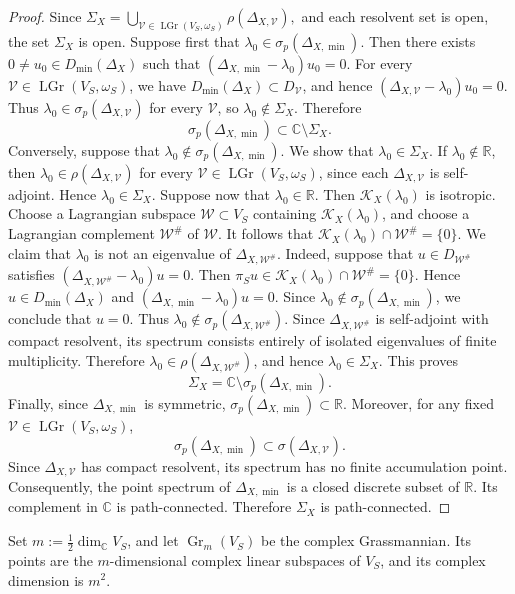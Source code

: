 \documentclass[12pt]{amsart}
\theoremstyle{plain}
\theoremstyle{definition}
\theoremstyle{remark}
\numberwithin{equation}{section} \numberwithin{figure}{section}
\newcommand{\mb}[1]{\mathbb{#1}} %
\newcommand{\mc}[1]{\mathcal{#1}}
\begin{document}
\begin{proof}
Since
\(
    \Sigma_X
    =
    \bigcup_{\mc V\in\operatorname{LGr}(V_S,\omega_S)}
    \rho(\Delta_{X,\mc V}),
\)
and each resolvent set is open, the set \(\Sigma_X\) is open.
Suppose first that
\(\lambda_0\in\sigma_p(\Delta_{X,\min})\). Then there exists
\(0\neq u_0\in D_{\min}(\Delta_X)\) such that
\(
    (\Delta_{X,\min}-\lambda_0)u_0=0.
\)
For every
\(\mc V\in\operatorname{LGr}(V_S,\omega_S)\), we have
\(D_{\min}(\Delta_X)\subset D_{\mc V}\), and hence
\(
    (\Delta_{X,\mc V}-\lambda_0)u_0=0.
\)
Thus
\(\lambda_0\in\sigma_p(\Delta_{X,\mc V})\) for every \(\mc V\), so
\(\lambda_0\notin\Sigma_X\). Therefore
\[
    \sigma_p(\Delta_{X,\min})
    \subset
    \mb C\setminus\Sigma_X.
\]
Conversely, suppose that
\(\lambda_0\notin\sigma_p(\Delta_{X,\min})\). We show that
\(\lambda_0\in\Sigma_X\).
If \(\lambda_0\notin\mb R\), then
\(\lambda_0\in\rho(\Delta_{X,\mc V})\) for every
\(\mc V\in\operatorname{LGr}(V_S,\omega_S)\), since each
\(\Delta_{X,\mc V}\) is self-adjoint. Hence
\(\lambda_0\in\Sigma_X\).
Suppose now that \(\lambda_0\in\mb R\). Then
\(\mc K_X(\lambda_0)\) is isotropic. Choose a Lagrangian subspace
\(\mc W\subset V_S\) containing \(\mc K_X(\lambda_0)\), and choose a
Lagrangian complement \(\mc W^\#\) of \(\mc W\). It follows that
\(
    \mc K_X(\lambda_0)\cap\mc W^\#=\{0\}.
\)
We claim that \(\lambda_0\) is not an eigenvalue of
\(\Delta_{X,\mc W^\#}\). Indeed, suppose that
\(u\in D_{\mc W^\#}\) satisfies
\(
    (\Delta_{X,\mc W^\#}-\lambda_0)u=0.
\)
Then
\(
    \pi_Su
    \in
    \mc K_X(\lambda_0)\cap\mc W^\#
    =
    \{0\}.
\)
Hence \(u\in D_{\min}(\Delta_X)\) and
\(
    (\Delta_{X,\min}-\lambda_0)u=0.
\)
Since
\(\lambda_0\notin\sigma_p(\Delta_{X,\min})\), we conclude that
\(u=0\). Thus
\(\lambda_0\notin\sigma_p(\Delta_{X,\mc W^\#})\).
Since \(\Delta_{X,\mc W^\#}\) is self-adjoint with compact resolvent,
its spectrum consists entirely of isolated eigenvalues of finite
multiplicity. Therefore
\(\lambda_0\in\rho(\Delta_{X,\mc W^\#})\), and hence
\(\lambda_0\in\Sigma_X\). This proves
\[
    \Sigma_X
    =
    \mb C\setminus\sigma_p(\Delta_{X,\min}).
\]
Finally, since \(\Delta_{X,\min}\) is symmetric,
\(\sigma_p(\Delta_{X,\min})\subset\mb R\). Moreover, for any fixed
\(\mc V\in\operatorname{LGr}(V_S,\omega_S)\),
\[
    \sigma_p(\Delta_{X,\min})
    \subset
    \sigma(\Delta_{X,\mc V}).
\]
Since \(\Delta_{X,\mc V}\) has compact resolvent, its spectrum has no
finite accumulation point. Consequently, the point spectrum of
\(\Delta_{X,\min}\) is a closed discrete subset of \(\mb R\). Its
complement in \(\mb C\) is path-connected.
Therefore \(\Sigma_X\) is path-connected.
\end{proof}
Set \(m:=\frac12\dim_{\mb C}V_S\), and let
\(\operatorname{Gr}_m(V_S)\) be the complex Grassmannian. Its points
are the \(m\)-dimensional complex linear subspaces of \(V_S\), and its
complex dimension is \(m^2\).
\end{document}
